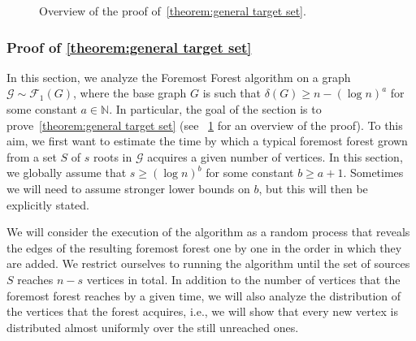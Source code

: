 \documentclass[a4paper,11pt]{article}
\theoremstyle{definition}
\theoremstyle{plain}
\newcommand{\NN}{\ensuremath{\mathbb{N}}}
\newcommand{\FFF}{\mathcal{F}}
\newcommand{\GGG}{\mathcal{G}}
\begin{document}
\begin{figure}[t]
    \caption{Overview of the proof of~\cref{theorem:general target set}.}
    \label{fig:reading_guide}
\end{figure}



\subsubsection{Proof of \cref{theorem:general target set}}
\label{sec: foremost forest analysis}
In this section, we analyze the Foremost Forest algorithm on a graph $\GGG\sim\FFF_1(G)$, where the base graph $G$ is such that $\delta(G)\ge n-(\log n)^a$ for some constant $a\in \NN$. In particular, the goal of the section is to prove~\cref{theorem:general target set} (see ~\cref{fig:reading_guide} for an overview of the proof). 
To this aim, we first want to estimate the time by which a typical foremost forest grown from a set $S$ of $s$ roots in $\GGG$ acquires a given number of vertices.
In this section, we globally assume that $s\ge (\log n)^b$ for some constant $b\ge a + 1$.
Sometimes we will need to assume stronger lower bounds on $b$, but this will then be explicitly stated.

We will consider the execution of the algorithm as a random process that reveals the edges of the resulting foremost forest one by one in the order in which they are added.
We restrict ourselves to running the algorithm until the set of sources $S$ reaches $n-s$ vertices in total.
In addition to the number of vertices that the foremost forest reaches by a given time, we will also analyze the distribution of the vertices that the forest acquires, i.e., we will show that every new vertex is distributed almost uniformly over the still unreached ones.
\end{document}
